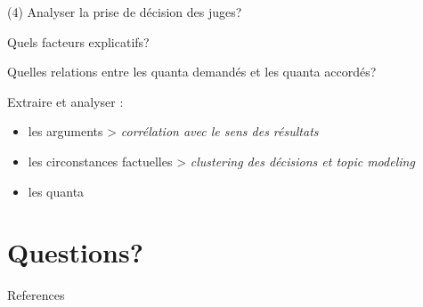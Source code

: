 \documentclass[newPxFont,pagenumber]{beamer}
\begin{document}
\begin{frame}{(4) Analyser la prise de décision des juges?}


Quels facteurs explicatifs?

Quelles relations entre les quanta demandés et les quanta accordés?

Extraire et analyser :

\begin{itemize}
\item  les arguments > \textit{corrélation avec le sens des résultats}

\item les circonstances factuelles > \textit{clustering des décisions et topic modeling}

\item les quanta 

\end{itemize}

\end{frame}


\section{Questions?}
\begin{frame}[t,allowframebreaks]{References}
\tiny

	
\end{frame}
\end{document}
